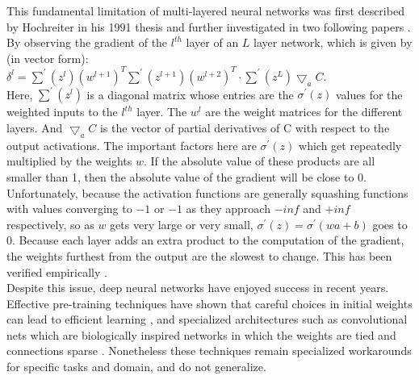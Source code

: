 \documentclass[12pt,oneside]{CUNY_CS_PhD}
\begin{document}
This fundamental limitation of multi-layered neural networks was first described by Hochreiter in his 1991 thesis \cite{hochreiter1991untersuchungen} and further investigated in two following papers \cite{hochreiter1998vanishing, hochreiter2001gradient}. By observing the gradient of the $l^{th}$ layer of an $L$ layer network, which is given by (in vector form):\\ $\delta^l = \sum^\prime(z^l)(w^{l+1})^T \sum^\prime(z^{l+1})(w^{l+2})^T \cdot \sum^\prime(z^L)\bigtriangledown_a C$. \\
Here, $\sum^\prime(z^l)$ is a diagonal matrix whose entries are the $\sigma^\prime(z)$ values for the weighted inputs to the $l^{th}$ layer. The $w^l$ are the weight matrices for the different layers. And $\bigtriangledown_a C$ is the vector of partial derivatives of C with respect to the output activations. The important factors here are $\sigma^\prime(z)$ which get repeatedly multiplied by the weights $w$. If the absolute value of these products are all smaller than 1, then the absolute value of the gradient will be close to 0. Unfortunately, because the activation functions are generally squashing functions with values converging to $-1$ or $-1$ as they approach $-inf$ and $+inf$ respectively, so as $w$ gets very large or very small, $\sigma^\prime(z) = \sigma^\prime  (wa+b)$ goes to 0. Because each layer adds an extra product to the computation of the gradient, the weights furthest from the output are the slowest to change. This has been verified empirically \cite{backpropNielsen2014, glorot2010understanding, lecun2012efficient}.\\
Despite this issue, deep neural networks have enjoyed success in recent years. Effective pre-training techniques have shown that careful choices in initial weights can lead to efficient learning \cite{sutskever2013importance}, and specialized architectures such as convolutional nets which are biologically inspired networks in which the weights are tied and connections sparse \cite{collobert_unified_2008, krizhevsky2012imagenet}. Nonetheless these techniques remain specialized workarounds for specific tasks and domain, and do not generalize. %
\end{document}
